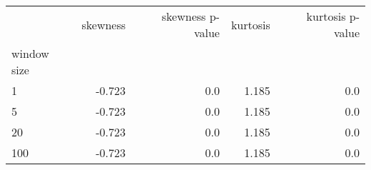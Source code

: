 \begin{tabular}{lrrrr}
\toprule
{} &  skewness &  skewness p-value &  kurtosis &  kurtosis p-value \\
window size &           &                   &           &                   \\
\midrule
1           &    -0.723 &               0.0 &     1.185 &               0.0 \\
5           &    -0.723 &               0.0 &     1.185 &               0.0 \\
20          &    -0.723 &               0.0 &     1.185 &               0.0 \\
100         &    -0.723 &               0.0 &     1.185 &               0.0 \\
\bottomrule
\end{tabular}
